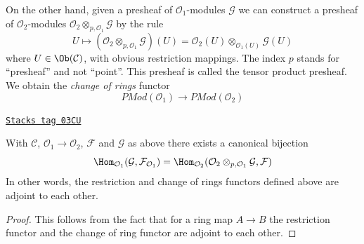 \medskip\noindent
On the other hand, given a presheaf of $\mathcal{O}_1$-modules
$\mathcal{G}$
we can construct a presheaf of $\mathcal{O}_2$-modules
$\mathcal{O}_2 \otimes_{p, \mathcal{O}_1} \mathcal{G}$
by the rule
$$
U \longmapsto
\left(\mathcal{O}_2 \otimes_{p, \mathcal{O}_1} \mathcal{G}\right)(U)
=
\mathcal{O}_2(U) \otimes_{\mathcal{O}_1(U)} \mathcal{G}(U)
$$
where $U \in \Ob(\mathcal{C})$, with obvious restriction mappings.
The index $p$ stands for ``presheaf'' and not ``point''.
This presheaf is called the tensor product presheaf. We obtain
the {\it change of rings} functor
$$
\textit{PMod}(\mathcal{O}_1)
\longrightarrow
\textit{PMod}(\mathcal{O}_2)
$$

\begin{lemma}
\label{sites-modules-lemma-adjointness-tensor-restrict-presheaves}
\href{https://stacks.math.columbia.edu/tag/03CU}{\texttt{Stacks tag 03CU}}

With $\mathcal{C}$, $\mathcal{O}_1 \to \mathcal{O}_2$, $\mathcal{F}$ and
$\mathcal{G}$ as above there exists a canonical bijection
$$
\Hom_{\mathcal{O}_1}(\mathcal{G}, \mathcal{F}_{\mathcal{O}_1})
=
\Hom_{\mathcal{O}_2}(
\mathcal{O}_2 \otimes_{p, \mathcal{O}_1} \mathcal{G},
\mathcal{F}
)
$$
In other words, the restriction and change of rings functors defined
above are adjoint to each other.
\end{lemma}

\begin{proof}
This follows from the fact that for a ring map
$A \to B$ the restriction functor and the change
of ring functor are adjoint to each other.
\end{proof}

